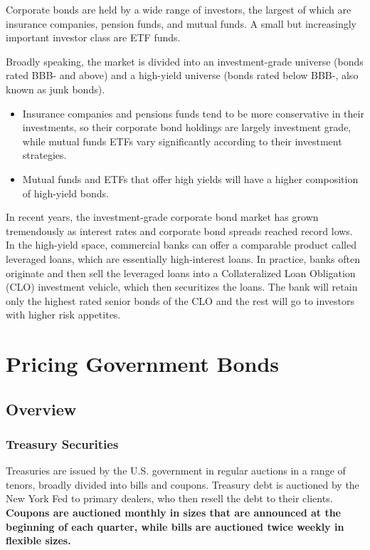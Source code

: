 \documentclass[
]{book}
\providecommand{\tightlist}{%
  \setlength{\itemsep}{0pt}\setlength{\parskip}{0pt}}
\begin{document}
Corporate bonds are held by a wide range of investors, the largest of which are insurance companies, pension funds, and mutual funds. A small but increasingly important investor class are ETF funds.

Broadly speaking, the market is divided into an investment-grade universe (bonds rated BBB- and above) and a high-yield universe (bonds rated below BBB-, also known as junk bonds).

\begin{itemize}
\tightlist
\item
  Insurance companies and pensions funds tend to be more conservative in their investments, so their corporate bond holdings are largely investment grade, while mutual funds ETFs vary significantly according to their investment strategies.
\item
  Mutual funds and ETFs that offer high yields will have a higher composition of high-yield bonds.
\end{itemize}

In recent years, the investment-grade corporate bond market has grown tremendously as interest rates and corporate bond spreads reached record lows. In the high-yield space, commercial banks can offer a comparable product called leveraged loans, which are essentially high-interest loans. In practice, banks often originate and then sell the leveraged loans into a Collateralized Loan Obligation (CLO) investment vehicle, which then securitizes the loans. The bank will retain only the highest rated senior bonds of the CLO and the rest will go to investors with higher risk appetites.

\hypertarget{pricing-government-bonds}{%
\chapter{Pricing Government Bonds}\label{pricing-government-bonds}}

\hypertarget{overview-1}{%
\section{Overview}\label{overview-1}}

\hypertarget{treasury-securities}{%
\subsection{Treasury Securities}\label{treasury-securities}}

Treasuries are issued by the U.S. government in regular auctions in a range of tenors, broadly divided into bills and coupons. Treasury debt is auctioned by the New York Fed to primary dealers, who then resell the debt to their clients. \textbf{Coupons are auctioned monthly in sizes that are announced at the beginning of each quarter, while bills are auctioned twice weekly in flexible sizes.}
\end{document}
